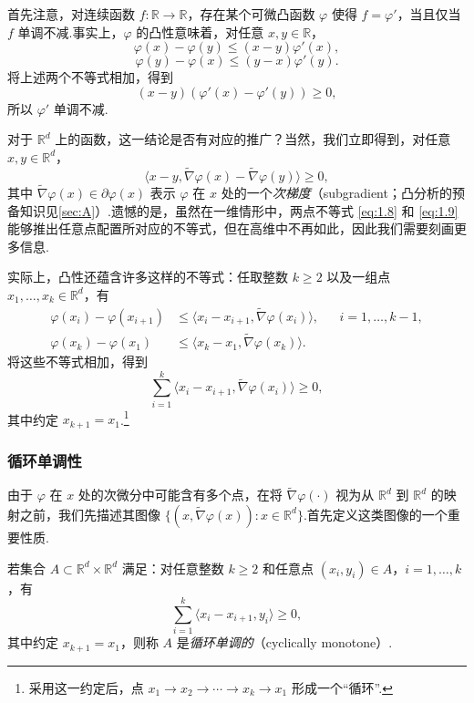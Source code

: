 首先注意，对连续函数 $f:\mathbb R\to\mathbb R$，存在某个可微凸函数 $\varphi$ 使得 $f=\varphi'$，当且仅当 $f$ 单调不减.事实上，$\varphi$ 的凸性意味着，对任意 $x,y\in\mathbb R$，
\begin{equation}\label{eq:1.8}
\varphi(x)-\varphi(y)\le(x-y)\varphi'(x),
\end{equation}
\begin{equation}\label{eq:1.9}
\varphi(y)-\varphi(x)\le(y-x)\varphi'(y).
\end{equation}
将上述两个不等式相加，得到
$$
(x-y)(\varphi'(x)-\varphi'(y))\ge0,
$$
所以 $\varphi'$ 单调不减.

对于 $\mathbb R^d$ 上的函数，这一结论是否有对应的推广？当然，我们立即得到，对任意 $x,y\in\mathbb R^d$，
$$
\langle x-y,\widetilde\nabla\varphi(x)-\widetilde\nabla\varphi(y)\rangle\ge0,
$$
其中 $\widetilde\nabla\varphi(x)\in\partial\varphi(x)$ 表示 $\varphi$ 在 $x$ 处的一个\emph{次梯度}（subgradient；凸分析的预备知识见\autoref{sec:A}）.遗憾的是，虽然在一维情形中，两点不等式 \eqref{eq:1.8} 和 \eqref{eq:1.9} 能够推出任意点配置所对应的不等式，但在高维中不再如此，因此我们需要刻画更多信息.

实际上，凸性还蕴含许多这样的不等式：任取整数 $k\ge2$ 以及一组点 $x_1,\allowbreak\ldots,\allowbreak x_k\in\mathbb R^d$，有
$$
\begin{aligned}
\varphi(x_i)-\varphi(x_{i+1})
&\le\langle x_i-x_{i+1},\widetilde\nabla\varphi(x_i)\rangle,
&&i=1,\ldots,k-1,\\
\varphi(x_k)-\varphi(x_1)
&\le\langle x_k-x_1,\widetilde\nabla\varphi(x_k)\rangle.
\end{aligned}
$$
将这些不等式相加，得到
\begin{equation}\label{eq:1.10}
\sum_{i=1}^k\langle x_i-x_{i+1},\widetilde\nabla\varphi(x_i)\rangle\ge0,
\end{equation}
其中约定 $x_{k+1}=x_1$.\footnote{采用这一约定后，点 $x_1\to x_2\to\cdots\to x_k\to x_1$ 形成一个“循环”.}

\subsubsection{循环单调性}\label{sec:1.4.2}

由于 $\varphi$ 在 $x$ 处的次微分中可能含有多个点，在将 $\widetilde\nabla\varphi(\cdot)$ 视为从 $\mathbb R^d$ 到 $\mathbb R^d$ 的映射之前，我们先描述其图像 $\{(x,\widetilde\nabla\varphi(x)):x\in\mathbb R^d\}$.首先定义这类图像的一个重要性质.

\begin{definition}\label{def:1.9}
若集合 $A\subset\mathbb R^d\times\mathbb R^d$ 满足：对任意整数 $k\ge2$ 和任意点 $(x_i,y_i)\in A$，$i=1,\ldots,k$，有
\begin{equation}\label{eq:1.11}
\sum_{i=1}^k\langle x_i-x_{i+1},y_i\rangle\ge0,
\end{equation}
其中约定 $x_{k+1}=x_1$，则称 $A$ 是\emph{循环单调的}（cyclically monotone）.
\end{definition}

